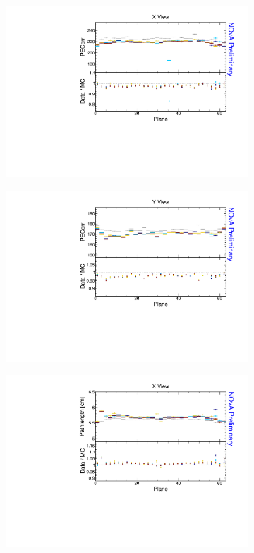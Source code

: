 \begin{figure}[!ht]
\begin{subfigure}{0.5\textwidth}
  \end{subfigure}
  \begin{subfigure}{0.5\textwidth}
    \includegraphics[width=\linewidth]{essentialsec_tb/pecorr_plane_x.pdf}
  \end{subfigure}
  \begin{subfigure}{0.5\textwidth}
    \includegraphics[width=\linewidth]{essentialsec_tb/pecorr_plane_y.pdf}
  \end{subfigure}
  \begin{subfigure}{0.5\textwidth}
    \includegraphics[width=\linewidth]{essentialsec_tb/cm_plane_x.pdf}

\end{subfigure}
\end{figure}
